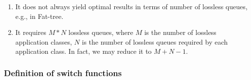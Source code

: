 
\begin{enumerate}
	\item It does not always yield optimal results in terms of number of lossless queues, e.g., in Fat-tree.
	
	\item It requires $M*N$ lossless queues, where $M$ is the number of lossless application classes, 
	$N$ is the number of lossless queues required by each application class. In fact, we may reduce it to $M+N-1$.
 
\end{enumerate}

\subsubsection{Definition of switch functions}
 
